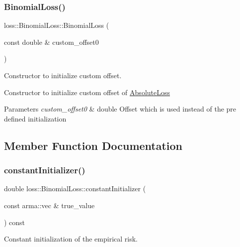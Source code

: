 \subsubsection{\texorpdfstring{Binomial\+Loss()}{LossBinomial()}\hspace{0.1cm}{\footnotesize\ttfamily [2/2]}}
{\footnotesize\ttfamily loss\+::\+Binomial\+Loss\+::\+Binomial\+Loss (\begin{DoxyParamCaption}\item[{const double \&}]{custom\+\_\+offset0 }\end{DoxyParamCaption})}



Constructor to initialize custom offset. 

Constructor to initialize custom offset of {\ttfamily \mbox{\hyperlink{classloss_1_1_absolute_loss}{Absolute\+Loss}}}


\begin{DoxyParams}{Parameters}
{\em custom\+\_\+offset0} & {\ttfamily double} Offset which is used instead of the pre defined initialization \\
\hline
\end{DoxyParams}


\subsection{Member Function Documentation}
\mbox{\label{classloss_1_1_binomial_loss_a1292422a2b07c8ebe1b168375940b029}} 
\subsubsection{\texorpdfstring{constant\+Initializer()}{constantInitializer()}}
{\footnotesize\ttfamily double loss\+::\+Binomial\+Loss\+::constant\+Initializer (\begin{DoxyParamCaption}\item[{const arma\+::vec \&}]{true\+\_\+value }\end{DoxyParamCaption}) const\hspace{0.3cm}{\ttfamily [virtual]}}



Constant initialization of the empirical risk. 

